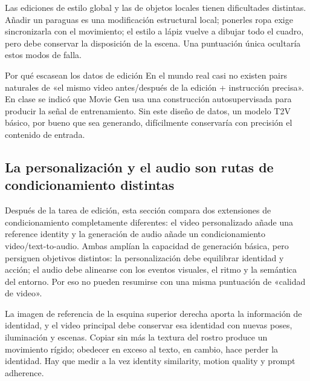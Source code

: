 
Las ediciones de estilo global y las de objetos locales tienen dificultades distintas. Añadir un paraguas es una modificación estructural local; ponerles ropa exige sincronizarla con el movimiento; el estilo a lápiz vuelve a dibujar todo el cuadro, pero debe conservar la disposición de la escena. Una puntuación única ocultaría estos modos de falla.

\begin{knowledgebox}{Por qué escasean los datos de edición}
En el mundo real casi no existen pairs naturales de «el mismo video antes/después de la edición + instrucción precisa». En clase se indicó que Movie Gen usa una construcción autosupervisada para producir la señal de entrenamiento. Sin este diseño de datos, un modelo T2V básico, por bueno que sea generando, difícilmente conservaría con precisión el contenido de entrada.
\end{knowledgebox}

\subsection{La personalización y el audio son rutas de condicionamiento distintas}

Después de la tarea de edición, esta sección compara dos extensiones de condicionamiento completamente diferentes: el video personalizado añade una reference identity y la generación de audio añade un condicionamiento video/text-to-audio. Ambas amplían la capacidad de generación básica, pero persiguen objetivos distintos: la personalización debe equilibrar identidad y acción; el audio debe alinearse con los eventos visuales, el ritmo y la semántica del entorno. Por eso no pueden resumirse con una misma puntuación de «calidad de video».


La imagen de referencia de la esquina superior derecha aporta la información de identidad, y el video principal debe conservar esa identidad con nuevas poses, iluminación y escenas. Copiar sin más la textura del rostro produce un movimiento rígido; obedecer en exceso al texto, en cambio, hace perder la identidad. Hay que medir a la vez identity similarity, motion quality y prompt adherence.

